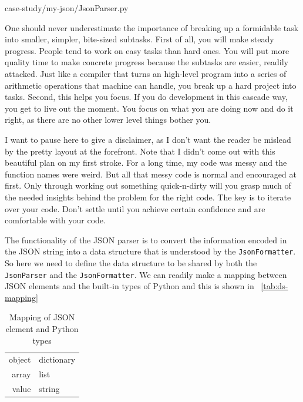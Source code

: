 \documentclass[oneside,11pt]{book}
\theoremstyle{definition}
\theoremstyle{remark}
\newcommand{\code}[1]{\mbox{\lstinline{#1}}}
\newcommand{\python}{Python }
\begin{document}

{case-study/my-json/JsonParser.py}

One should never underestimate the importance of breaking up a formidable task into smaller,
simpler, bite-sized subtasks.
First of all, you will make steady progress.
People tend to work on easy tasks than hard ones.
You will put more quality time to make concrete progress because the subtasks are easier, readily
attacked.
Just like a compiler that turns an high-level program into a series of arithmetic
operations that machine can handle, you break up a hard project into tasks.
Second, this helps you focus.
If you do development in this cascade way, you get to live out the moment.
You focus on what you are doing now and do it right, as there are no other lower level things
bother you.

I want to pause here to give a disclaimer, as
I don't want the reader be mislead by the pretty layout at the forefront.
Note that I didn't come out with this beautiful plan on my first stroke.
For a long time, my code was messy and the function names were weird.
But all that messy code is normal and encouraged at first.
Only through working out something quick-n-dirty will you grasp much of the needed insights
behind the problem for the right code.
The key is to iterate over your code.
Don't settle until you achieve certain confidence and are comfortable with your code.

The functionality of the JSON parser is to convert the information encoded in the JSON string
into a data structure that is understood by the \code{JsonFormatter}.
So here we need to define the data structure to be shared by both the \code{JsonParser} and the
\code{JsonFormatter}.
We can readily make a mapping between JSON elements and the built-in types of \python and this is
shown in ~\autoref{tab:ds-mapping}

\begin{table}[h]
    \begin{center}
        \caption{Mapping of JSON element and \python types
        \label{tab:ds-mapping}}
        \begin{tabular}{r|l}
            object & dictionary \\
            array & list \\
            value & string \\
        \end{tabular}
    \end{center}
\end{table}
\end{document}
